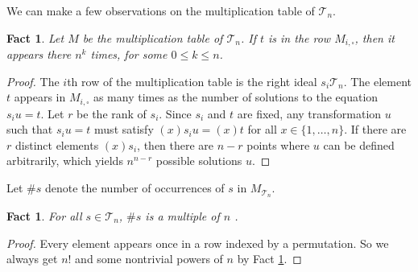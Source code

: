 \documentclass{amsart}
\newcommand{\cT}{{\mathcal T}}
\newcommand{\todo}[1]{\textcolor{red}{ \small \textsf{[ #1 ]} \normalsize}}
\theoremstyle{plain}
\newtheorem{fact}[theorem]{Fact}
\theoremstyle{definition}
\begin{document}
We can make a few observations on the multiplication table of $\cT_n$.
\begin{fact}
\label{fact:npower}
Let $M$ be the multiplication table of $\cT_n$.
If $t$ is in the row $M_{i,\square}$, then it appears there $n^k$ times, for some $0\leq k\leq n$.
\end{fact}
\begin{proof}
The $i$th row of the multiplication table is the right  ideal $s_i\cT_n$.
The element $t$ appears in $M_{i,\square}$ as many times as the number of solutions to the equation $s_iu=t$.
Let $r$ be the rank of $s_i$. 
Since $s_i$ and $t$ are fixed, any transformation $u$ such that
  $s_iu=t$ must satisfy $(x)s_iu=(x)t$ for all $x\in \{1,\ldots, n\}$. If there
  are $r$ distinct elements $(x)s_i$, then there are $n-r$ points where $u$ can
be defined arbitrarily, which yields $n^{n-r}$ possible solutions $u$.
\end{proof}
Let $\#s$ denote the number of occurrences of $s$ in $M_{\cT_n}$.
\begin{fact}
For all $s\in\cT_n$, $\#s$ is a multiple of $n$ .
\end{fact}
\begin{proof}
Every element appears once in a row indexed by a permutation.
So we always get $n!$ and some nontrivial powers of $n$ by Fact \ref{fact:npower}.
\end{proof}
\end{document}
